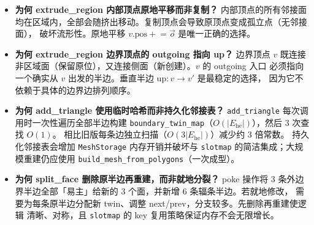 \documentclass[11pt,a4paper]{article}
\begin{document}
\begin{itemize}
        朝向应保持不变。复用 $F$ 避免了删除原面 + 新建顶面的开销，
        且内部边的 twin 关系天然保留（仅更新 vertex 字段）。
        这与 \texttt{extrude\_face} 的策略（保留底面 + 新建反向顶面）不同，
        因为 \texttt{extrude\_face} 处理的是孤立面，而 \texttt{extrude\_region} 处理的是
        嵌入在网格中的面，需要保持与非区域面的拓扑连接。
  \item \textbf{为何 extrude\_region 内部顶点原地平移而非复制？} 内部顶点的所有邻接面
        均在区域内，全部会随挤出移动。复制顶点会导致原顶点变成孤立点（无邻接面），
        破坏流形性。原地平移 $v.\text{pos} \mathrel{+}= \vec{o}$ 是唯一正确的选择。
  \item \textbf{为何 extrude\_region 边界顶点的 outgoing 指向 up？} 边界顶点 $v$
        既连接非区域面（保留原位），又连接侧面（新创建）。$v$ 的 outgoing 入口
        必须指向一个确实从 $v$ 出发的半边。垂直半边 $\text{up}: v \to v'$ 是最稳定的选择，
        因为它不依赖于具体的边界边排列顺序。
  \item \textbf{为何 add\_triangle 使用临时哈希而非持久化邻接表？}
        \texttt{add\_triangle} 每次调用时一次性遍历全部半边构建
        \texttt{boundary\_twin\_map}（$O(|E_{\mathrm{he}}|)$），然后 3 次查找 $O(1)$。
        相比旧版每条边独立扫描（$O(3|E_{\mathrm{he}}|)$）减少约 3 倍常数。
        持久化邻接表会增加 \texttt{MeshStorage} 内存开销并破坏与 \texttt{slotmap}
        的简洁集成；大规模重建仍应使用 \texttt{build\_mesh\_from\_polygons}（一次成型）。
  \item \textbf{为何 split\_face 删除原半边再重建，而非就地分裂？} poke 操作将
        3 条外边界半边全部「易主」给新的 3 个面，并新增 6 条辐条半边。若就地修改，
        需要为每条原半边分配新 twin、调整 next/prev，分支较多。先删除再重建使逻辑
        清晰、对称，且 \texttt{slotmap} 的 key 复用策略保证内存不会无限增长。
\end{itemize}
\end{document}
